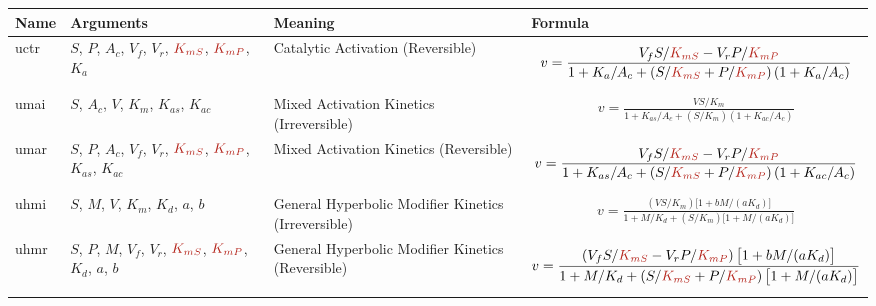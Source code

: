\documentclass[10pt]{cekarticle}
\newcommand{\changed}[1]{\textcolor{BrickRed}{#1}}
\newenvironment{blockChanged}{\color{BrickRed}}{}
\begin{document}
\addtocounter{table}{-1}
\begin{table}[ht]
\setlength{\abovedisplayskip}{-2pt}
\setlength{\belowdisplayskip}{1pt}
\begin{tabular}{|p{0.45in}|>{\raggedright}m{0.77in}|>{\raggedright}m{1.05in}|m{3.5in}|}
\hline
\textbf{Name} & \textbf{Arguments} & \textbf{Meaning} & \textbf{Formula} \\
\hline

uctr & $S$, $P$, $A_c$, $V_f$, $V_r$, $\changed{K_{mS}}$, $\changed{K_{mP}}$, $K_a$ &
Catalytic Activation (Reversible) &
\begin{gather*}
v = \frac{V_f S/\changed{K_{mS}} - V_r P/\changed{K_{mP}}}{1 +
K_a/A_c + \left( S/\changed{K_{mS}} + P/\changed{K_{mP}}\right) \left( 1 + K_a/A_c\right)}
\end{gather*}
\\ \hline

umai & $S$, $A_c$, $V$, $K_m$, \changed{$K_{as}$}, \changed{$K_{ac}$} & Mixed Activation
Kinetics (Irreversible) &
\begin{blockChanged}
\begin{gather*}
v = \frac{V S/K_m}{1 + K_{as}/A_c + \left( S/K_m \right) \left( 1 + K_{ac}/A_c\right)}
\end{gather*}
\end{blockChanged}
\\ \hline

umar & $S$, $P$, $A_c$, $V_f$, $V_r$, $\changed{K_{mS}}$, $\changed{K_{mP}}$, $K_{as}$, $K_{ac}$ &
Mixed Activation Kinetics (Reversible) &
\begin{gather*}
v = \frac{V_f S/\changed{K_{mS}} - V_r P/\changed{K_{mP}}}{1 + K_{as}/A_c + \left( S/\changed{K_{mS}} +
    P/\changed{K_{mP}}\right) \left( 1 + K_{ac}/A_c\right)}
\end{gather*}
\\ \hline

uhmi & $S$, $M$, $V$, $K_m$, $K_d$, $a$, $b$ & General Hyperbolic
Modifier Kinetics (Irreversible) &
\begin{blockChanged}
\begin{gather*}
v = \frac{(V S/K_m) \bigl[ 1 + b M / (a K_d)\bigr] }{1 + M/K_d + ( S/K_m ) \bigl[ 1 + M/(a K_d)\bigr]}
\end{gather*}
\end{blockChanged}
\\ \hline

uhmr & $S$, $P$, $M$, $V_f$, $V_r$, $\changed{K_{mS}}$, $\changed{K_{mP}}$, $K_d$, $a$, $b$ &
General Hyperbolic Modifier Kinetics (Reversible) &
\begin{gather*}
v = \frac{\left( V_f S/\changed{K_{mS}} - V_r P/\changed{K_{mP}}\right) \bigl[ 1 + b M / (a
K_d)\bigr] }{1 + M/K_d + \left( S/\changed{K_{mS}} + P/\changed{K_{mP}} \right) \bigl[ 1 +
M/(a K_d)\bigr]}
\end{gather*}
\\ \hline


\end{tabular}
\end{table}
\end{document}
